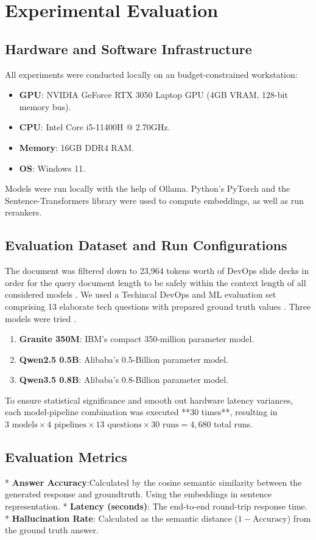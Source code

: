 \documentclass[conference]{IEEEtran}
\begin{document}
\section{Experimental Evaluation}
\subsection{Hardware and Software Infrastructure}
All experiments were conducted locally on an budget-constrained workstation:
\begin{itemize}
    \item \textbf{GPU}: NVIDIA GeForce RTX 3050 Laptop GPU (4GB VRAM, 128-bit memory bus).
    \item \textbf{CPU}: Intel Core i5-11400H @ 2.70GHz.
    \item \textbf{Memory}: 16GB DDR4 RAM.
    \item \textbf{OS}: Windows 11.
\end{itemize}
Models were run locally with the help of Ollama. Python’s PyTorch and the Sentence-Transformers library were used to compute embeddings, as well as run rerankers.
\subsection{Evaluation Dataset and Run Configurations}
The document was filtered down to 23,964 tokens worth of DevOps slide decks in order for the query document length to be safely within the context length of all considered models . We used a Techincal DevOps and ML evaluation set comprising 13 elaborate tech questions with prepared ground truth values . Three models were tried .
\begin{enumerate}
    \item \textbf{Granite 350M}: IBM's compact 350-million parameter model.
    \item \textbf{Qwen2.5 0.5B}: Alibaba's 0.5-Billion parameter model.
    \item \textbf{Qwen3.5 0.8B}: Alibaba's 0.8-Billion parameter model.
\end{enumerate}
To ensure statistical significance and smooth out hardware latency variances, each model-pipeline combination was executed **30 times**, resulting in $3 \text{ models} \times 4 \text{ pipelines} \times 13 \text{ questions} \times 30 \text{ runs} = 4,680$ total runs.
\subsection{Evaluation Metrics}
* \textbf{Answer Accuracy}:Calculated by the cosine semantic similarity between the generated response and groundtruth. Using the embeddings in sentence representation.
* \textbf{Latency (seconds)}: The end-to-end round-trip response time.
* \textbf{Hallucination Rate}: Calculated as the semantic distance ($1 - \text{Accuracy}$) from the ground truth answer.
\end{document}
